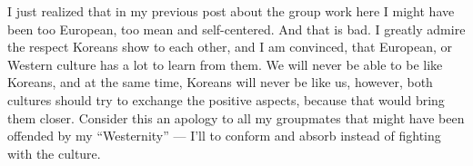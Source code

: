 \begin{post}
	\begin{content}
I just realized that in my previous post about the group work here I might have been too European, too mean and self-centered. And that is bad. I greatly admire the respect Koreans show to each other, and I am convinced, that European, or Western culture has a lot to learn from them. We will never be able to be like Koreans, and at the same time, Koreans will never be like us, however, both cultures should try to exchange the positive aspects, because that would bring them closer. Consider this an apology to all my groupmates that might have been offended by my ``Westernity'' --- I'll to conform and absorb instead of fighting with the culture.
	\end{content}
\end{post}
